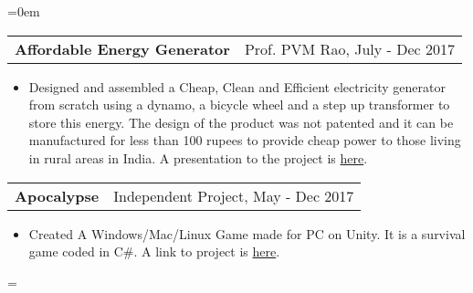 \documentclass{article}
\makeatletter
\newenvironment{longversion}{}{} %
\newenvironment{absolutelynopagebreak}
  {\par\nobreak\vfil\penalty0\vfilneg
   \vtop\bgroup}
  {\par\xdef\tpd{\the\prevdepth}\egroup
   \prevdepth=\tpd}
\newcommand{\headerrow}[2]
{\begin{tabular*}{\linewidth}{l@{\extracolsep{\fill}}r}
	#1 &
	#2 \\
\end{tabular*}}
\makeatother
\begin{document}
\begin{absolutelynopagebreak}
\begin{longversion}
\begin{list} {}{\leftmargin=0em}
\headerrow { \textbf{Affordable Energy Generator}} {Prof. PVM Rao, July - Dec 2017}
 \begin{itemize} \item[]
 Designed and assembled a Cheap, Clean and Efficient electricity generator from scratch using a dynamo, a bicycle wheel and a step up transformer to store this energy. The design of the product was not patented and it can be manufactured for less than 100 rupees to provide cheap power to those living in rural areas in India. A presentation to the project is \href{https://csciitd-my.sharepoint.com/:p:/g/personal/ee1170938_csciitd_onmicrosoft_com/EaSyGhWUxVlJg2bV1XZGJvAB0vl_h_SEt4NfQzvOdwgxYQ?e=KFC30i}{here}.
 \end{itemize}


\item[]
\headerrow {\textbf{Apocalypse}} {Independent Project, May - Dec 2017}
\begin{itemize} \item[]
Created A Windows/Mac/Linux Game made for PC on Unity. It is a survival game coded in C\#. A link to project is \href{https://github.com/Yashpandey4/Apocalypse-the-game}{here}.
\end{itemize}

\end{list}


\end{longversion}


\end{absolutelynopagebreak}
\end{document}
